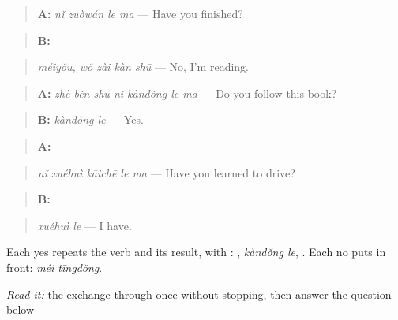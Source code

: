 \begin{quote}
\textbf{A:} \emph{nǐ zuòwán le ma} — Have you finished?
\end{quote}

\begin{quote}
\textbf{B:}  
\end{quote}

\begin{quote}
\emph{méiyǒu, wǒ zài kàn shū} — No, I'm reading.
\end{quote}

\begin{quote}
\textbf{A:} \emph{zhè běn shū nǐ kàndǒng le ma} — Do you follow this book?
\end{quote}

\begin{quote}
\textbf{B:} \emph{kàndǒng le} — Yes.
\end{quote}

\begin{quote}
\textbf{A:} 
\end{quote}

\begin{quote}
\emph{nǐ xuéhuì kāichē le ma} — Have you learned to drive?
\end{quote}

\begin{quote}
\textbf{B:} 
\end{quote}

\begin{quote}
\emph{xuéhuì le} — I have.
\end{quote}

Each yes repeats the verb and its result, with : , \emph{kàndǒng le}, . Each no puts  in front: \emph{méi tīngdǒng}.

\begin{tcolorbox}[breakable,skin=enhanced,colback=orange!6,colframe=orange!45!black,boxrule=0.5pt,arc=1mm,left=6pt,right=6pt,top=4pt,bottom=4pt,fonttitle=\bfseries,title={Read this}]
\emph{Read it:} the exchange through once without stopping, then answer the question below
\end{tcolorbox}


